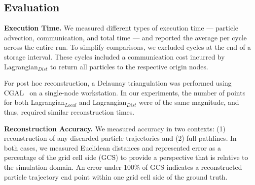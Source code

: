 \subsection{Evaluation}
\label{sec:metrics}
%
\textbf{Execution Time.} We measured different types of execution time --- particle advection, communication, and total time --- and reported the average per cycle across the entire run.
%
To simplify comparisons, we excluded cycles at the end of a storage interval. 
%
These cycles included a communication cost incurred by Lagrangian$_{Dist}$ to return all particles to the respective origin nodes. 
%

For post hoc reconstruction, a Delaunay triangulation was performed using CGAL~\cite{2020cgal} on a single-node workstation.
%
In our experiments, the number of points for both Lagrangian$_{Local}$ and Lagrangian$_{Dist}$ were of the same magnitude, and thus, required similar reconstruction times.
%
%
%
%
%
%

\textbf{Reconstruction Accuracy.} We measured accuracy in two contexts: (1) reconstruction of any discarded particle trajectories and (2) full pathlines.  
%
In both cases, we measured Euclidean distances and represented error as a percentage of the grid cell side (GCS) to provide a perspective that is relative to the simulation domain.
%
An error under 100\% of GCS indicates a reconstructed particle trajectory end point within one grid cell side of the ground truth.

